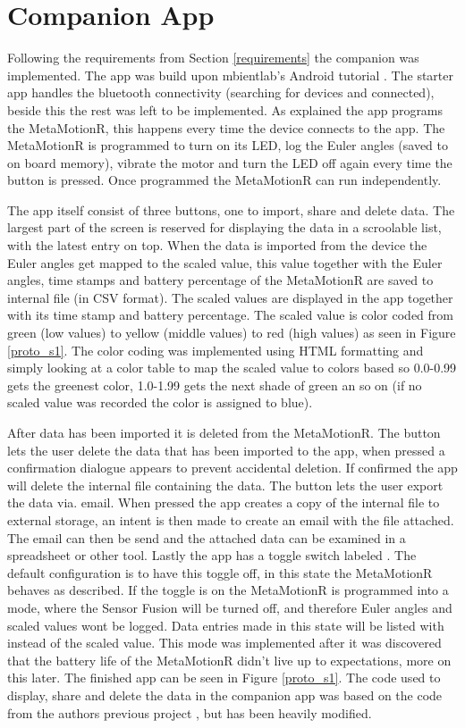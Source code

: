 \section{Companion App}
Following the requirements from Section \ref{requirements} the companion was implemented. The app was build upon mbientlab's Android tutorial \cite{starter_mbient}. The starter app handles the bluetooth connectivity (searching for devices and connected), beside this the rest was left to be implemented. As explained the app programs the MetaMotionR, this happens every time the device connects to the app. The MetaMotionR is programmed to turn on its LED, log the Euler angles (saved to on board memory), vibrate the motor and turn the LED off again every time the button is pressed. Once programmed the MetaMotionR can run independently.

The app itself consist of three buttons, one to import, share and delete data. The largest part of the screen is reserved for displaying the data in a scroolable list, with the latest entry on top. When the data is imported from the device the Euler angles get mapped to the scaled value, this value together with the Euler angles, time stamps and battery percentage of the MetaMotionR are saved to internal file (in CSV format). The scaled values are displayed in the app together with its time stamp and battery percentage. The scaled value is color coded from green (low values) to yellow (middle values) to red (high values) as seen in Figure \ref{proto_s1}. The color coding was implemented using HTML formatting and simply looking at a color table to map the scaled value to colors based so 0.0-0.99 gets the greenest color, 1.0-1.99 gets the next shade of green an so on (if no scaled value was recorded the color is assigned to blue).

After data has been imported it is deleted from the MetaMotionR. The  button lets the user delete the data that has been imported to the app, when pressed a confirmation dialogue appears to prevent accidental deletion. If confirmed the app will delete the internal file containing the data. The  button lets the user export the data via. email. When pressed the app creates a copy of the internal file to external storage, an intent is then made to create an email with the file attached. The email can then be send and the attached data can be examined in a spreadsheet or other tool. Lastly the app has a toggle switch labeled . The default configuration is to have this toggle off, in this state the MetaMotionR behaves as described. If the toggle is on the MetaMotionR is programmed into a  mode, where the Sensor Fusion will be turned off, and therefore Euler angles and scaled values wont be logged. Data entries made in this state will be listed with \say{--} instead of the scaled value. This mode was implemented after it was discovered that the battery life of the MetaMotionR didn't live up to expectations, more on this later. The finished app can be seen in Figure \ref{proto_s1}. The code used to display, share and delete the data in the companion app was based on the code from the authors previous project \cite{mood}, but has been heavily modified.

